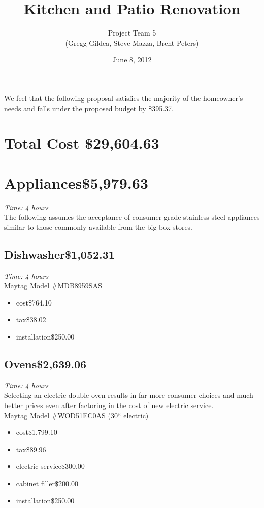 \documentclass[letterpaper,10pt]{article}
\title{Kitchen and Patio Renovation}
\author{Project Team 5 \\ { \small (Gregg Gildea, Steve Mazza, Brent Peters)}}
\date{June 8, 2012}
\begin{document}
\maketitle

We feel that the following proposal satisfies the majority of the homeowner's needs and falls under the proposed budget by \$395.37.

\section*{Total Cost \dotfill\$29,604.63}

\section{Appliances\dotfill\$5,979.63}
\emph{Time: 4 hours} \\
The following assumes the acceptance of consumer-grade stainless steel appliances similar to those commonly available from the big box stores.

\subsection{Dishwasher\dotfill\$1,052.31}
\emph{Time: 4 hours} \\
Maytag Model \#MDB8959SAS
	\begin{itemize}
		\item cost\dotfill \$764.10 
		\item tax\dotfill \$38.02 
		\item installation\dotfill \$250.00 
	\end{itemize}
\subsection{Ovens\dotfill\$2,639.06}
\emph{Time: 4 hours} \\
Selecting an electric double oven results in far more consumer choices and much better prices even after factoring in the cost of new electric service.\\
Maytag Model \#WOD51EC0AS  (30`` electric)
	\begin{itemize}
		\item cost\dotfill\$1,799.10
		\item tax\dotfill\$89.96
		\item electric service\dotfill\$300.00
		\item cabinet filler\dotfill\$200.00
		\item installation\dotfill\$250.00
	\end{itemize}
\end{document}
